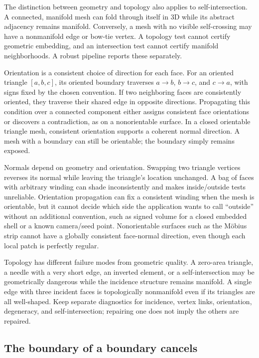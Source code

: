The distinction between geometry and topology also applies to self-intersection. A connected, manifold mesh can fold through itself in 3D while its abstract adjacency remains manifold. Conversely, a mesh with no visible self-crossing may have a nonmanifold edge or bow-tie vertex. A topology test cannot certify geometric embedding, and an intersection test cannot certify manifold neighborhoods. A robust pipeline reports these separately.

Orientation is a consistent choice of direction for each face. For an oriented triangle \([a,b,c]\), its oriented boundary traverses \(a\to b\), \(b\to c\), and \(c\to a\), with signs fixed by the chosen convention. If two neighboring faces are consistently oriented, they traverse their shared edge in opposite directions. Propagating this condition over a connected component either assigns consistent face orientations or discovers a contradiction, as on a nonorientable surface. In a closed orientable triangle mesh, consistent orientation supports a coherent normal direction. A mesh with a boundary can still be orientable; the boundary simply remains exposed.

Normals depend on geometry and orientation. Swapping two triangle vertices reverses its normal while leaving the triangle's location unchanged. A bag of faces with arbitrary winding can shade inconsistently and makes inside/outside tests unreliable. Orientation propagation can fix a consistent winding when the mesh is orientable, but it cannot decide which side the application wants to call ``outside'' without an additional convention, such as signed volume for a closed embedded shell or a known camera/seed point. Nonorientable surfaces such as the Möbius strip cannot have a globally consistent face-normal direction, even though each local patch is perfectly regular.

Topology has different failure modes from geometric quality. A zero-area triangle, a needle with a very short edge, an inverted element, or a self-intersection may be geometrically dangerous while the incidence structure remains manifold. A single edge with three incident faces is topologically nonmanifold even if its triangles are all well-shaped. Keep separate diagnostics for incidence, vertex links, orientation, degeneracy, and self-intersection; repairing one does not imply the others are repaired.

\subsection{The boundary of a boundary cancels}\label{03-visual-computing-i-ch002-the-boundary-of-a-boundary-cancels}

